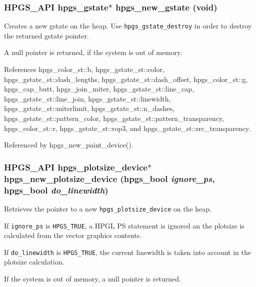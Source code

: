 \subsubsection[hpgs\_\-new\_\-gstate]{\setlength{\rightskip}{0pt plus 5cm}HPGS\_\-API {\bf hpgs\_\-gstate}$\ast$ hpgs\_\-new\_\-gstate (void)}\label{group__device_gd474e8eca187bdde4ad1608d46029562}


Creates a new gstate on the heap. Use {\tt hpgs\_\-gstate\_\-destroy} in order to destroy the returned gstate pointer.

A null pointer is returned, if the system is out of memory. 

References hpgs\_\-color\_\-st::b, hpgs\_\-gstate\_\-st::color, hpgs\_\-gstate\_\-st::dash\_\-lengths, hpgs\_\-gstate\_\-st::dash\_\-offset, hpgs\_\-color\_\-st::g, hpgs\_\-cap\_\-butt, hpgs\_\-join\_\-miter, hpgs\_\-gstate\_\-st::line\_\-cap, hpgs\_\-gstate\_\-st::line\_\-join, hpgs\_\-gstate\_\-st::linewidth, hpgs\_\-gstate\_\-st::miterlimit, hpgs\_\-gstate\_\-st::n\_\-dashes, hpgs\_\-gstate\_\-st::pattern\_\-color, hpgs\_\-gstate\_\-st::pattern\_\-transparency, hpgs\_\-color\_\-st::r, hpgs\_\-gstate\_\-st::rop3, and hpgs\_\-gstate\_\-st::src\_\-transparency.

Referenced by hpgs\_\-new\_\-paint\_\-device().
\subsubsection[hpgs\_\-new\_\-plotsize\_\-device]{\setlength{\rightskip}{0pt plus 5cm}HPGS\_\-API {\bf hpgs\_\-plotsize\_\-device}$\ast$ hpgs\_\-new\_\-plotsize\_\-device (hpgs\_\-bool {\em ignore\_\-ps}, \/  hpgs\_\-bool {\em do\_\-linewidth})}\label{group__device_gdd6dbaffaf1e09f9c771cbf60eb45e3f}


Retrieves the pointer to a new {\tt hpgs\_\-plotsize\_\-device} on the heap.

If {\tt ignore\_\-ps} is {\tt HPGS\_\-TRUE}, a HPGL PS statement is ignored an the plotsize is calculated from the vector graphics contents.

If {\tt do\_\-linewidth} is {\tt HPGS\_\-TRUE}, the current linewidth is taken into account in the plotsize calculation.

If the system is out of memory, a null pointer is returned. 

